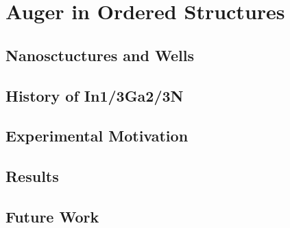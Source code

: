 \section{Auger in Ordered Structures}\label{auger-in-ordered-structures}

\subsection{Nanosctuctures and Wells}\label{nanosctuctures-and-wells}

\subsection{History of In1/3Ga2/3N}\label{history-of-in13ga23n}

\subsection{Experimental Motivation}\label{experimental-motivation}

\subsection{Results}\label{results}

\subsection{Future Work}\label{future-work}
